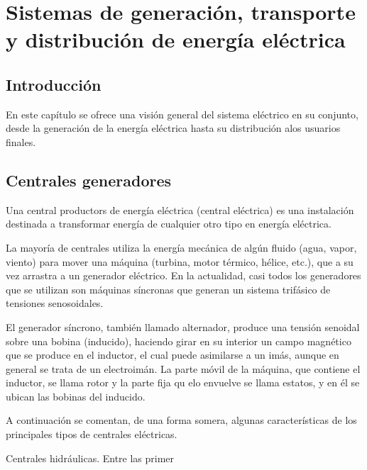 \chapter{Sistemas de generación, transporte y distribución de energía eléctrica}
\section{Introducción}
En este capítulo se ofrece una visión general del sistema eléctrico en su conjunto, desde la generación de la energía eléctrica hasta su distribución alos usuarios finales.

\section{Centrales generadores}
Una central productors de energía eléctrica (central eléctrica) es una instalación destinada a transformar energía de cualquier otro tipo en energía eléctrica.

La mayoría de centrales utiliza la energía mecánica de algún fluido (agua, vapor, viento) para mover una máquina (turbina, motor térmico, hélice, etc.), que a su vez arrastra a un generador eléctrico. En la actualidad, casi todos los generadores que se utilizan son máquinas síncronas que generan un sistema trifásico de tensiones senosoidales.

El generador síncrono, también llamado alternador, produce una tensión senoidal sobre una bobina (inducido), haciendo girar en su interior un campo magnético que se produce en el inductor, el cual puede asimilarse a un imás, aunque en general se trata de un electroimán. La parte móvil de la máquina, que contiene el inductor, se llama rotor y la parte fija qu elo envuelve se llama estatos, y en él se ubican las bobinas del inducido.

A continuación se comentan, de una forma somera, algunas características de los principales tipos de centrales eléctricas.

Centrales hidráulicas. Entre las primer